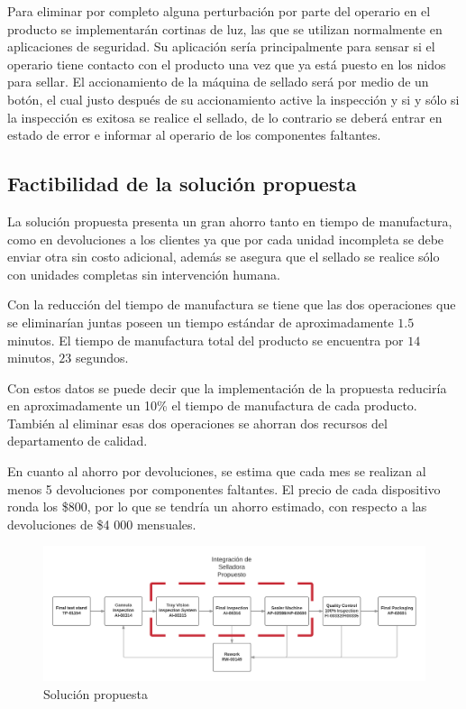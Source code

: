 \documentclass[12pt, twoside, letterpaper]{book}
\begin{document}
Para eliminar por completo alguna perturbaci\'on por parte del operario en el producto se implementar\'an cortinas de luz, las que se utilizan normalmente en aplicaciones de seguridad. Su aplicaci\'on ser\'ia principalmente para sensar si el operario tiene contacto con el producto una vez que ya est\'a puesto en los nidos para sellar. El accionamiento de la m\'aquina de sellado ser\'a por medio de un bot\'on, el cual justo despu\'es de su accionamiento active la inspecci\'on y si y s\'olo si la inspecci\'on es exitosa se realice el sellado, de lo contrario se deber\'a entrar en estado de error e informar al operario de los componentes faltantes.

\subsection{Factibilidad de la soluci\'on propuesta}

La soluci\'on propuesta presenta un gran ahorro tanto en tiempo de manufactura, como en devoluciones a los clientes ya que por cada unidad incompleta se debe enviar otra sin costo adicional, adem\'as se asegura que el sellado se realice s\'olo con unidades completas sin intervenci\'on humana. \par

Con la reducci\'on del tiempo de manufactura se tiene que las dos operaciones que se eliminar\'ian juntas poseen un tiempo est\'andar de aproximadamente $1.5$ minutos. El tiempo de manufactura total del producto se encuentra por $14$ minutos, $23$ segundos.  \par

Con estos datos se puede decir que la implementaci\'on de la propuesta reducir\'ia en aproximadamente un 10\% el tiempo de manufactura de cada producto. Tambi\'en al eliminar esas dos operaciones se ahorran dos recursos del departamento de calidad. \par

En cuanto al ahorro por devoluciones, se estima que cada mes se realizan al menos 5 devoluciones por componentes faltantes. El precio de cada dispositivo ronda los \$800, por lo que se tendr\'ia un ahorro estimado, con respecto a las devoluciones de \$4 000 mensuales.

\begin{figure}[H]
\centering
\includegraphics[width=1\textwidth]{flowchartPropuesto}
\caption{Soluci\'on propuesta}
\label{fig:solution}
\end{figure}
\end{document}
